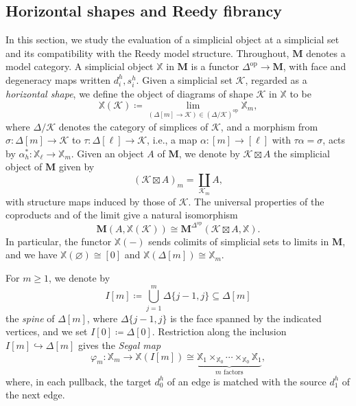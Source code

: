 \documentclass[10pt,reqno]{amsart}
\begin{document}
\subsection{Horizontal shapes and Reedy fibrancy}
\label{subsec:prelim_reedy}


In this section, we study the evaluation of a simplicial object at a
simplicial set and its compatibility with the Reedy model structure.
Throughout, $\mathbf M$ denotes a model category. A simplicial object
$\mathbb X$ in $\mathbf M$ is a functor
$\Delta^{\mathrm{op}}\to\mathbf M$, with face and degeneracy maps
written $d_i^h,s_i^h$. Given a simplicial set $\mathcal K$,
regarded as a \emph{horizontal shape}, we define the object of diagrams
of shape $\mathcal K$ in $\mathbb X$ to be
\begin{equation}
\label{eq:global_shape_mapping}
\mathbb X(\mathcal K)\coloneqq
\lim_{(\Delta[m]\to \mathcal K)\in(\Delta/\mathcal K)^{\mathrm{op}}}\mathbb X_m,
\end{equation}
where $\Delta/\mathcal K$ denotes the category of simplices of
$\mathcal K$, and a morphism from $\sigma:\Delta[m]\to \mathcal K$
to $\tau:\Delta[\ell]\to \mathcal K$, i.e., a map
$\alpha:[m]\to[\ell]$ with $\tau\alpha=\sigma$, acts by
$\alpha_h^*:\mathbb X_\ell\to\mathbb X_m$. Given an object $A$ of
$\mathbf M$, we denote by $\mathcal K\boxtimes A$ the simplicial
object of $\mathbf M$ given by
\[
(\mathcal K\boxtimes A)_m=\coprod_{\mathcal K_m}A,
\]
with structure maps induced by those of $\mathcal K$. The universal
properties of the coproducts and of the limit give a natural
isomorphism
\[
\mathbf M(A,\mathbb X(\mathcal K))\cong
\mathbf M^{\Delta^{\mathrm{op}}}(\mathcal K\boxtimes A,\mathbb X).
\]
In particular, the functor $\mathbb X(-)$ sends colimits of
simplicial sets to limits in $\mathbf M$, and we have
$\mathbb X(\varnothing)\cong[0]$ and
$\mathbb X(\Delta[m])\cong\mathbb X_m$.

For $m\geq1$, we denote by
\[
I[m]\coloneqq\bigcup_{j=1}^{m}\Delta\{j-1,j\}\subseteq\Delta[m]
\]
the \emph{spine} of $\Delta[m]$, where $\Delta\{j-1,j\}$ is the
face spanned by the indicated vertices, and we set
$I[0]\coloneqq\Delta[0]$. Restriction along the inclusion
$I[m]\hookrightarrow\Delta[m]$ gives the \emph{Segal map}
\begin{equation}
\label{eq:horizontal_segal_map}
\varphi_m:\mathbb X_m\longrightarrow\mathbb X(I[m])
\cong\underbrace{\mathbb X_1\times_{\mathbb X_0}\cdots
\times_{\mathbb X_0}\mathbb X_1}_{m\text{ factors}},
\end{equation}
where, in each pullback, the target $d_0^h$ of an edge is matched
with the source $d_1^h$ of the next edge.
\end{document}
